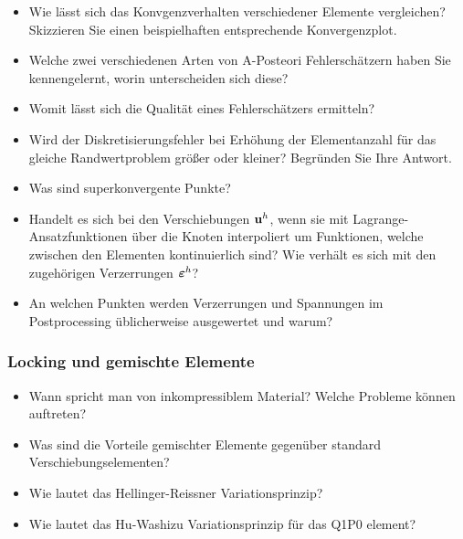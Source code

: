 \begin{itemize}
 \item Wie lässt sich das Konvgenzverhalten verschiedener Elemente vergleichen? Skizzieren Sie einen beispielhaften entsprechende Konvergenzplot.
 \item Welche zwei verschiedenen Arten von A-Posteori Fehlerschätzern haben Sie kennengelernt, worin unterscheiden sich diese?
 \item Womit lässt sich die Qualität eines Fehlerschätzers ermitteln?
 \item Wird der Diskretisierungsfehler bei Erhöhung der Elementanzahl für das gleiche Randwertproblem größer oder kleiner? Begründen Sie Ihre Antwort.
 \item Was sind superkonvergente Punkte?
 \item Handelt es sich bei den Verschiebungen ${{\bm{\mathrm{u}}}}^h$, wenn sie mit Lagrange-Ansatzfunktionen über die Knoten interpoliert um Funktionen, welche zwischen den Elementen kontinuierlich sind? Wie verhält es sich mit den zugehörigen Verzerrungen ${\bm{\varepsilon }}^h$? 
 \item An welchen Punkten werden Verzerrungen und Spannungen im Postprocessing üblicherweise ausgewertet und warum?
 \end{itemize}


\subsubsection*{Locking und gemischte Elemente}

\begin{itemize}
 \item Wann spricht man von inkompressiblem Material? Welche Probleme können auftreten?
 \item Was sind die Vorteile gemischter Elemente gegenüber standard Verschiebungselementen?
 \item Wie lautet das Hellinger-Reissner Variationsprinzip?
 \item Wie lautet das Hu-Washizu Variationsprinzip für das Q1P0 element?
\end{itemize}


